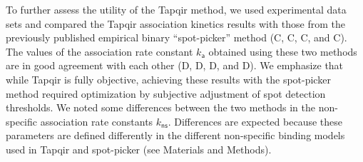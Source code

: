 To further assess the utility of the Tapqir method, we used experimental data sets and compared the Tapqir association kinetics results with those from the previously published empirical binary ``spot-picker'' method \citep{Friedman2015-nx} (C, C, C, and C). The values of the association rate constant $k_\mathsf{a}$ obtained using these two methods are in good agreement with each other (D, D, D, and D). We emphasize that while Tapqir is fully objective, achieving these results with the spot-picker method required optimization by subjective adjustment of spot detection thresholds.  We noted some differences between the two methods in the non-specific association rate constants $k_\mathsf{ns}$. Differences are expected because these parameters are defined differently in the different non-specific binding models used in Tapqir and  spot-picker (see Materials and Methods).





